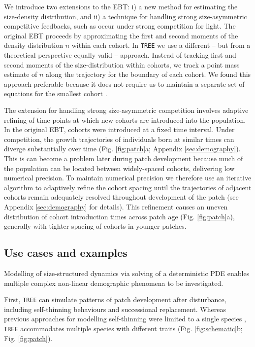 \documentclass[a4paper,11pt]{article}
\begin{document}
We introduce two extensions to the EBT: i) a new method for estimating
the size-density distribution, and ii) a technique for handling strong
size-asymmetric competitive feedbacks, such as occur under strong
competition for light. The original EBT
\citep{Deroos-1997, Deroos-1992, Deroos-1988} proceeds by approximating
the first and second moments of the density distribution \(n\) within
each cohort. In \texttt{TREE} we use a different -- but from a theoretical
perspective equally valid --  approach. Instead of tracking first and second
moments of the size-distribution within cohorts, we track a point mass
estimate of \(n\) along the trajectory for the boundary
of each cohort. We found this approach preferable because it does not
require us to maintain a separate set of equations for the smallest
cohort \citep{Deroos-1997}.

The extension for handling strong size-asymmetric competition involves
adaptive refining of time points at which new cohorts are introduced
into the population. In the original EBT, cohorts were introduced at a
fixed time interval. Under competition, the growth trajectories of
individuals born at similar times can diverge substantially over time
(Fig. \ref{fig:patch}a; Appendix \ref{sec:demography}).
This is can become a problem later during patch
development because much of the population can be located between
widely-spaced cohorts, delivering low numerical precision. To maintain
numerical precision we therefore use an iterative algorithm to adaptively refine
the cohort spacing until the trajectories of adjacent cohorts remain
adequately resolved throughout development of the patch (see
Appendix \ref{sec:demography} for details). This refinement causes an uneven
distribution of cohort introduction times across patch age (Fig.
\ref{fig:patch}a), generally with tighter spacing of cohorts in 
younger patches.

\subsection{Use cases and examples}

Modelling of size-structured dynamics via solving of a deterministic PDE
enables multiple complex non-linear demographic phenomena to be
investigated.

First, \texttt{TREE} can simulate patterns of patch development after
disturbance, including self-thinning behaviours and successional
replacement. Whereas previous approaches for modelling self-thinning
were limited to a single species
\citep[e.g.][]{Barnes-2004, Coomes-2007}, \texttt{TREE} accommodates multiple
 species with different traits (Fig. \ref{fig:schematic}b; Fig.
\ref{fig:patch}).
\end{document}
